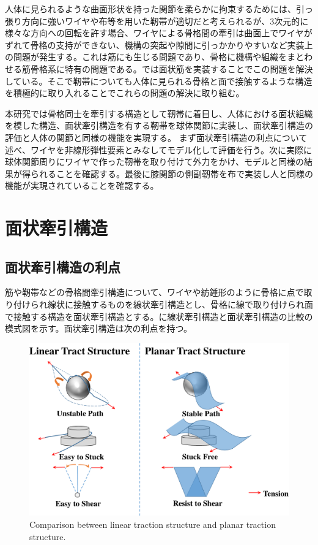 \documentclass{jarticle}
\begin{document}
人体に見られるような曲面形状を持った関節を柔らかに拘束するためには、引っ張り方向に強いワイヤや布等を用いた靭帯が適切だと考えられるが、3次元的に様々な方向への回転を許す場合、ワイヤによる骨格間の牽引は曲面上でワイヤがずれて骨格の支持ができない、機構の突起や隙間に引っかかりやすいなど実装上の問題が発生する。これは筋にも生じる問題であり、骨格に機構や組織をまとわせる筋骨格系に特有の問題である。\cite{Humanoids2011:osada:planar}では面状筋を実装することでこの問題を解決している。そこで靭帯についても人体に見られる骨格と面で接触するような構造を積極的に取り入れることでこれらの問題の解決に取り組む。

本研究では骨格同士を牽引する構造として靭帯に着目し、人体における面状組織を模した構造、面状牽引構造を有する靭帯を球体関節に実装し、面状牽引構造の評価と人体の関節と同様の機能を実現する。
まず面状牽引構造の利点について述べ、ワイヤを非線形弾性要素とみなしてモデル化して評価を行う。次に実際に球体関節周りにワイヤで作った靭帯を取り付けて外力をかけ、モデルと同様の結果が得られることを確認する。最後に膝関節の側副靭帯を布で実装し人と同様の機能が実現されていることを確認する。

\section{面状牽引構造}
\subsection{面状牽引構造の利点}
筋や靭帯などの骨格間牽引構造について、ワイヤや紡錘形のように骨格に点で取り付けられ線状に接触するものを線状牽引構造とし、骨格に線で取り付けられ面で接触する構造を面状牽引構造とする。に線状牽引構造と面状牽引構造の比較の模式図を示す。面状牽引構造は次の利点を持つ。

\begin{figure}[tb]
 \centering
  \includegraphics[width=1.0\columnwidth]{figs/schematic-comparison-of-structure.pdf}
  \vspace*{-4mm}
  \caption{Comparison between linear traction structure and planar traction structure.}
  \label{fig:schema}
\end{figure}
\end{document}
